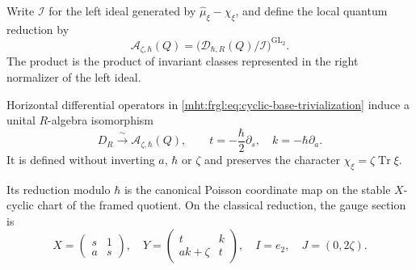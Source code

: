 Write $\mathcal I$ for the left ideal generated by
$\widehat\mu_\xi-\chi_\xi$, and define the local quantum
reduction by
\[
 \mathscr A_{\zeta,\hbar}(Q)
   =\bigl(\mathscr D_{\hbar,R}(Q)/\mathcal I\bigr)^{\operatorname{GL}_2}.
\]
The product is the product of invariant classes represented
in the right normalizer of the left ideal.

\begin{theorem}
\label{mht:frgl:thm:local-native-quantum-reduction}
Horizontal differential operators in
\eqref{mht:frgl:eq:cyclic-base-trivialization} induce a unital
$R$-algebra isomorphism
\begin{equation}\label{mht:frgl:eq:native-chart-quantum-isomorphism}
 D_R\xrightarrow{\ \sim\ }\mathscr A_{\zeta,\hbar}(Q),
 \qquad
 t=-\frac{\hbar}{2}\partial_s,\quad
 k=-\hbar\partial_a.
\end{equation}
It is defined without inverting $a$, $\hbar$ or $\zeta$ and
preserves the character $\chi_\xi=\zeta\operatorname{Tr}\xi$.

Its reduction modulo $\hbar$ is the canonical Poisson
coordinate map on the stable $X$-cyclic chart of the framed
quotient.  On the classical reduction, the gauge section is
\begin{equation}\label{mht:frgl:eq:companion-reduced-section}
 X=\begin{pmatrix}s&1\\a&s\end{pmatrix},\quad
 Y=\begin{pmatrix}t&k\\ak+\zeta&t\end{pmatrix},\quad
 I=e_2,\quad J=(0,2\zeta).
\end{equation}
\end{theorem}

